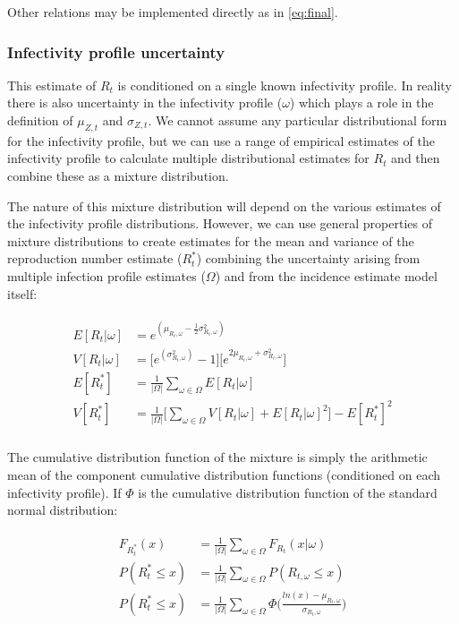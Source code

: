 \documentclass[10pt,letterpaper]{article}
\begin{document}
Other relations may be implemented directly as in \eqref{eq:final}.

\subsubsection*{Infectivity profile uncertainty}

This estimate of $R_t$ is conditioned on a single known infectivity profile. In reality there is also uncertainty in the infectivity profile ($\omega$) which plays a role in the definition of $\mu_{Z,t}$ and $\sigma_{Z,t}$. We cannot assume any particular distributional form for the infectivity profile, but we can use a range of empirical estimates of the infectivity profile to calculate multiple distributional estimates for $R_t$ and then combine these as a mixture distribution.

The nature of this mixture distribution will depend on the various estimates of the infectivity profile distributions. However, we can use general properties of mixture distributions to create estimates for the mean and variance of the reproduction number estimate ($R_t^*$) combining the uncertainty arising from multiple infection profile estimates ($\Omega$) and from the incidence estimate model itself:

\begin{eqnarray}
\label{eq:final_2}
\begin{aligned}
E[R_t|\omega] &= e^{(\mu_{R_t,\omega} - \frac{1}{2}\sigma_{R_t,\omega}^2)} \\
V[R_t|\omega] &= \big[e^{(\sigma_{R_t,\omega}^2)} - 1\big] \big[e^{2 \mu_{R_t,\omega} + \sigma_{R_t,\omega}^2}\big] \\
E[R_t^*] &= \frac{1}{|\Omega|}\sum_{\omega \in \Omega} E[{R_t|\omega}] \\
V[R_t^*] &= \frac{1}{|\Omega|} \bigg[\sum_{\omega \in \Omega}{V[R_t|\omega]+E[R_t|\omega]^2}\bigg] - E[R_t^*]^2 \\
\end{aligned}
\end{eqnarray}

The cumulative distribution function of the mixture is simply the arithmetic mean of the component cumulative distribution functions (conditioned on each infectivity profile). If $\Phi$ is the cumulative distribution function of the standard normal distribution:

\begin{eqnarray}
\label{eq:final_3}
\begin{aligned}
F_{R_t^*}(x) &= \frac{1}{|\Omega|}\sum_{\omega \in \Omega}F_{R_t}(x|\omega) \\
P(R_t^* \le x) &= \frac{1}{|\Omega|}\sum_{\omega \in \Omega} P(R_{t,\omega} \le x) \\
P(R_t^* \le x) &= \frac{1}{|\Omega|}\sum_{\omega \in \Omega} \Phi\bigg(\frac{ln(x) - \mu_{R_t,\omega}}{\sigma_{R_t,\omega}}\bigg)
\end{aligned}
\end{eqnarray}
\end{document}
